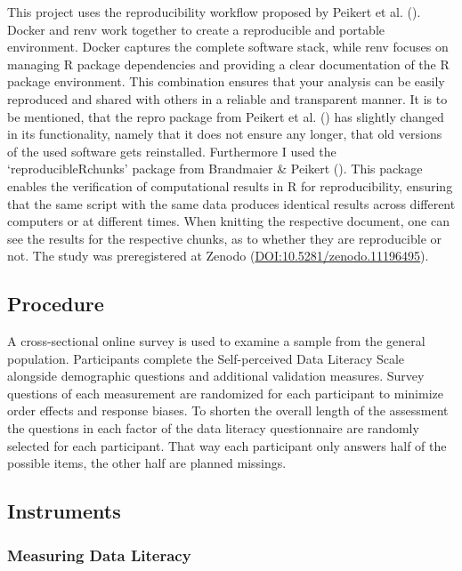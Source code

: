 \documentclass[
  12pt,
  a4paper,
  twoside]{article}
\begin{document}
This project uses the reproducibility workflow proposed by Peikert et al. (). Docker and renv work together to create a reproducible and portable environment. Docker captures the complete software stack, while renv focuses on
managing R package dependencies and providing a clear documentation of the R
package environment. This combination ensures that your analysis can be easily
reproduced and shared with others in a reliable and transparent manner. It is to be mentioned, that the repro package from Peikert et al. () has slightly changed in its functionality, namely that it does not ensure any longer, that old versions of the used software gets reinstalled. Furthermore I used the `reproducibleRchunks' package from Brandmaier \& Peikert (). This package enables the verification of computational results in R for reproducibility, ensuring that the same script with the same data produces identical results across different computers or at different times. When knitting the respective document, one can see the results for the respective chunks, as to whether they are reproducible or not.
The study was preregistered at Zenodo (\url{DOI:10.5281/zenodo.11196495}).

\subsection{Procedure}\label{procedure}

A cross-sectional online survey is used to examine a sample from the general population. Participants complete the Self-perceived Data Literacy Scale alongside demographic questions and additional validation measures. Survey questions of each measurement are randomized for each participant to minimize order effects and response biases. To shorten the overall length of the assessment the questions in each factor of the data literacy questionnaire are randomly selected for each participant. That way each participant only answers half of the possible items, the other half are planned missings.

\subsection{Instruments}\label{instruments}

\subsubsection{Measuring Data Literacy}\label{measuring-data-literacy}
\end{document}
